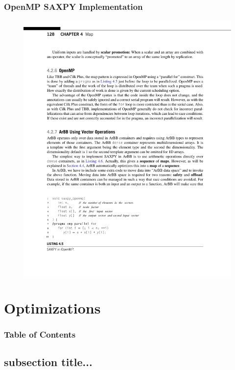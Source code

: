 \documentclass[xcolor=dvipsnames]{beamer}
\begin{document}
		\begin{frame} \frametitle{OpenMP SAXPY Implementation}
			\begin{figure}
				\centering
				\includegraphics[width=115mm]{images/listing-4-5.pdf}
			\end{figure}
		\end{frame}


\section{Optimizations} 

	\begin{frame} \frametitle{Table of Contents}
		\tableofcontents[currentsection]
	\end{frame} 
	
	
	\subsection{subsection title...}
	
\end{document}
